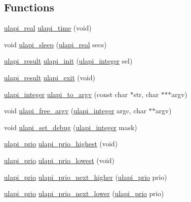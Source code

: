 \subsection*{Functions}
\begin{DoxyCompactItemize}
\item 
\hyperlink{ulapi_8hh_ac6e0274fd91c3dcd00a8802d6c5cfcb1}{ulapi\_\-real} \hyperlink{ulapi_8hh_a26153b5904618a6a8dc20219153e9d77}{ulapi\_\-time} (void)
\item 
void \hyperlink{ulapi_8hh_a6c74c62900526f0686245770ec09997b}{ulapi\_\-sleep} (\hyperlink{ulapi_8hh_ac6e0274fd91c3dcd00a8802d6c5cfcb1}{ulapi\_\-real} secs)
\item 
\hyperlink{ulapi_8hh_a02d216952303bc6dda8fde2827a2a01f}{ulapi\_\-result} \hyperlink{ulapi_8hh_a40d22bebf0bc7ef7e1b26aef92aa248e}{ulapi\_\-init} (\hyperlink{ulapi_8hh_a110e6b8de916c218a17feafb79167f79}{ulapi\_\-integer} sel)
\item 
\hyperlink{ulapi_8hh_a02d216952303bc6dda8fde2827a2a01f}{ulapi\_\-result} \hyperlink{ulapi_8hh_afce713a197141118626a9c3cc4af757d}{ulapi\_\-exit} (void)
\item 
\hyperlink{ulapi_8hh_a110e6b8de916c218a17feafb79167f79}{ulapi\_\-integer} \hyperlink{ulapi_8hh_ace8e4d66b7bac0c6b5c9f1b95745d680}{ulapi\_\-to\_\-argv} (const char $\ast$str, char $\ast$$\ast$$\ast$argv)
\item 
void \hyperlink{ulapi_8hh_a30c473a331c678239d1bea0862ab3950}{ulapi\_\-free\_\-argv} (\hyperlink{ulapi_8hh_a110e6b8de916c218a17feafb79167f79}{ulapi\_\-integer} argc, char $\ast$$\ast$argv)
\item 
void \hyperlink{ulapi_8hh_a02b41e2bf899d93d87d4b5762f93301e}{ulapi\_\-set\_\-debug} (\hyperlink{ulapi_8hh_a110e6b8de916c218a17feafb79167f79}{ulapi\_\-integer} mask)
\item 
\hyperlink{ulapi_8hh_ab471b0bc25f71285fe3f8c262cfb8f56}{ulapi\_\-prio} \hyperlink{ulapi_8hh_ad8bced2eff1e366df83624e4c785bf14}{ulapi\_\-prio\_\-highest} (void)
\item 
\hyperlink{ulapi_8hh_ab471b0bc25f71285fe3f8c262cfb8f56}{ulapi\_\-prio} \hyperlink{ulapi_8hh_a6c2aee05434d26ba9db08f972209cd7f}{ulapi\_\-prio\_\-lowest} (void)
\item 
\hyperlink{ulapi_8hh_ab471b0bc25f71285fe3f8c262cfb8f56}{ulapi\_\-prio} \hyperlink{ulapi_8hh_acef98e039cd8d1009d2bbd6477ebd9b1}{ulapi\_\-prio\_\-next\_\-higher} (\hyperlink{ulapi_8hh_ab471b0bc25f71285fe3f8c262cfb8f56}{ulapi\_\-prio} prio)
\item 
\hyperlink{ulapi_8hh_ab471b0bc25f71285fe3f8c262cfb8f56}{ulapi\_\-prio} \hyperlink{ulapi_8hh_a4449dcb019f56aef15499e89d2033136}{ulapi\_\-prio\_\-next\_\-lower} (\hyperlink{ulapi_8hh_ab471b0bc25f71285fe3f8c262cfb8f56}{ulapi\_\-prio} prio)
$$
\end{DoxyCompactItemize}
